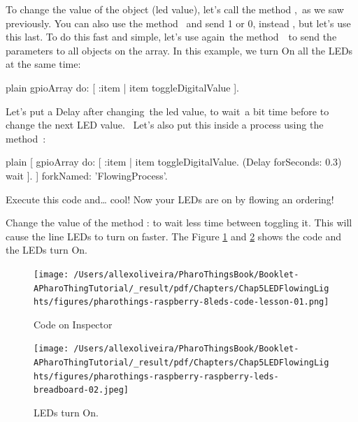 \documentclass[10pt,twoside,english]{_support/latex/sbabook/sbabook}
\begin{document}
To change the value of the object (led value), let's call the method , as we saw previously. You can also use the method  and send 1 or 0, instead , but let's use this last. To do this fast and simple, let's use again the method  to send the parameters to all objects on the array. In this example, we turn On all the LEDs at the same time:

\begin{displaycode}{plain}
gpioArray do: [ :item | item toggleDigitalValue ].
\end{displaycode}

Let's put a Delay after changing the led value, to wait a bit time before to change the next LED value.  Let's also put this inside a process using the method :

\begin{displaycode}{plain}
[
    gpioArray do: [ :item | item toggleDigitalValue. (Delay forSeconds: 0.3) wait ].
] forkNamed: 'FlowingProcess'.
\end{displaycode}

Execute this code and… cool! Now your LEDs are on by flowing an ordering!

Change the value of the method : to wait less time between toggling it. This will cause the line LEDs to turn on faster. The Figure \ref{Inspector8LEDs} and \ref{8LEDs} shows the code and the LEDs turn On.


\begin{figure}

\begin{center}
\texttt{[image: /Users/allexoliveira/PharoThingsBook/Booklet-APharoThingTutorial/\_result/pdf/Chapters/Chap5LEDFlowingLights/figures/pharothings-raspberry-8leds-code-lesson-01.png]}\caption{Code on Inspector\label{Inspector8LEDs}}\end{center}
\end{figure}


\begin{figure}

\begin{center}
\texttt{[image: /Users/allexoliveira/PharoThingsBook/Booklet-APharoThingTutorial/\_result/pdf/Chapters/Chap5LEDFlowingLights/figures/pharothings-raspberry-raspberry-leds-breadboard-02.jpeg]}\caption{LEDs turn On.\label{8LEDs}}\end{center}
\end{figure}
\end{document}
